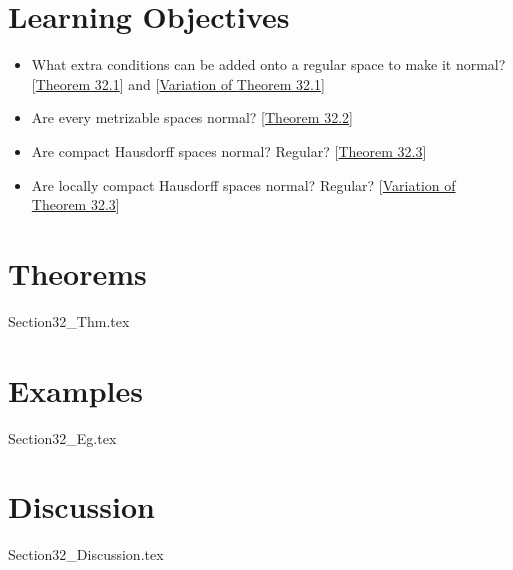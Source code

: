 \section{Learning Objectives}

\begin{itemize}
    \item What extra conditions can be added onto a regular space to make it normal?
        [\hyperlink{thm:32.1}{Theorem 32.1}] and 
        [\hyperlink{thm32.1-v}{Variation of Theorem 32.1}]
    \item Are every metrizable spaces normal?
        [\hyperlink{thm:32.2}{Theorem 32.2}]
    \item Are compact Hausdorff spaces normal? Regular?
        [\hyperlink{thm:32.3}{Theorem 32.3}]
    \item Are locally compact Hausdorff spaces normal? Regular?
        [\hyperlink{thm:32.3-v}{Variation of Theorem 32.3}]
\end{itemize}

\section{Theorems}

{Section32_Thm.tex}

\section{Examples}

{Section32_Eg.tex}

\section{Discussion}

{Section32_Discussion.tex}
